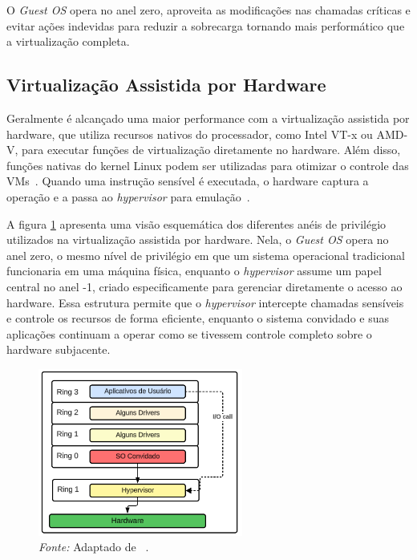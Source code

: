 O \textit{Guest OS} opera no anel zero, aproveita as modificações nas chamadas críticas e evitar ações indevidas para reduzir a sobrecarga tornando mais performático que a virtualização completa.

\subsection{Virtualização Assistida por Hardware}

Geralmente é alcançado uma maior performance com a virtualização assistida por hardware, que utiliza recursos nativos do processador, como Intel VT-x ou AMD-V, para executar funções de virtualização diretamente no hardware. Além disso, funções nativas do kernel Linux podem ser utilizadas para otimizar o controle das VMs~\citep{chirammal2016mastering}. Quando uma instrução sensível é executada, o hardware captura a operação e a passa ao \textit{hypervisor} para emulação~\citep{modernOS}.

A figura \ref{fig:hardware_assisted_rings} apresenta uma visão esquemática dos diferentes anéis de privilégio utilizados na virtualização assistida por hardware. Nela, o \textit{Guest OS} opera no anel zero, o mesmo nível de privilégio em que um sistema operacional tradicional funcionaria em uma máquina física, enquanto o \textit{hypervisor} assume um papel central no anel -1, criado especificamente para gerenciar diretamente o acesso ao hardware. Essa estrutura permite que o \textit{hypervisor} intercepte chamadas sensíveis e controle os recursos de forma eficiente, enquanto o sistema convidado e suas aplicações continuam a operar como se tivessem controle completo sobre o hardware subjacente.

\begin{figure}[htbp]
  \centering
  \caption{Virtualização assistida por hardware nos anéis de segurança. A figura mostra o \textit{Guest OS} operando no anel 0 e o \textit{hypervisor} no anel -1, permitindo um gerenciamento eficiente do hardware e reduzindo a necessidade de emulação por software.}
  \includegraphics[width=0.6\textwidth]{images/hardware_assisted_rings.png}
  \caption*{\textit{Fonte:} Adaptado de ~\citep{chirammal2016mastering}.}
  \label{fig:hardware_assisted_rings}
\end{figure}

